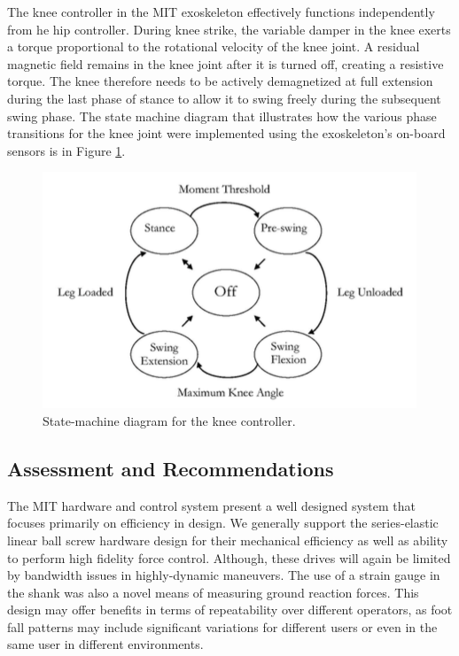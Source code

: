 \begin{refsection}
 The knee controller in the MIT exoskeleton effectively functions independently from he hip controller.  During knee strike, the variable damper in the knee exerts a torque proportional to the rotational velocity of the knee joint.  A residual magnetic field remains in the knee joint after it is turned off, creating a resistive torque.  The knee therefore needs to be actively demagnetized at full extension during the last phase of stance to allow it to swing freely during the subsequent swing phase.  The state machine diagram that illustrates how the various phase transitions for the knee joint were implemented using the exoskeleton's on-board sensors is in Figure \ref{fig:kneeControl}.
\begin{figure}[thpb]
\centering
\includegraphics[width=3.in]{exos/figs/MIT/kneeControl}
  \caption{State-machine diagram for the knee controller.}
 \label{fig:kneeControl} 
 \end{figure}  
  
  
% 
 
 
 \subsection{Assessment and Recommendations}
 
 The MIT hardware and control system present a well designed system that focuses primarily on efficiency in design.  We generally support the series-elastic linear ball screw hardware design for their mechanical efficiency as well as ability to perform high fidelity force control.  Although, these drives will again be limited by bandwidth issues in highly-dynamic maneuvers.  The use of a strain gauge in the shank was also a novel means of measuring ground reaction forces.  This design may offer benefits in terms of repeatability over different operators, as foot fall patterns may include significant variations for different users or even in the same user in different environments.
 

\end{refsection}
